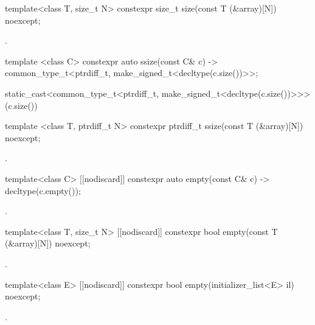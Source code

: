 %
\begin{itemdecl}
template<class T, size_t N> constexpr size_t size(const T (&array)[N]) noexcept;
\end{itemdecl}
\begin{itemdescr}
\pnum \returns {}.
\end{itemdescr}

%
\begin{itemdecl}
template <class C>
constexpr auto ssize(const C& c)
    -> common_type_t<ptrdiff_t, make_signed_t<decltype(c.size())>>;
\end{itemdecl}
\begin{itemdescr}
\pnum \returns
\begin{codeblock}
static_cast<common_type_t<ptrdiff_t, make_signed_t<decltype(c.size())>>>(c.size())
\end{codeblock}
\end{itemdescr}

%
\begin{itemdecl}
template <class T, ptrdiff_t N>
constexpr ptrdiff_t ssize(const T (&array)[N]) noexcept;
\end{itemdecl}
\begin{itemdescr}
\pnum \returns {}.
\end{itemdescr}

%
\begin{itemdecl}
template<class C> [[nodiscard]] constexpr auto empty(const C& c) -> decltype(c.empty());
\end{itemdecl}
\begin{itemdescr}
\pnum \returns {}.
\end{itemdescr}

%
\begin{itemdecl}
template<class T, size_t N> [[nodiscard]] constexpr bool empty(const T (&array)[N]) noexcept;
\end{itemdecl}
\begin{itemdescr}
\pnum \returns {}.
\end{itemdescr}

%
\begin{itemdecl}
template<class E> [[nodiscard]] constexpr bool empty(initializer_list<E> il) noexcept;
\end{itemdecl}
\begin{itemdescr}
\pnum \returns {}.
\end{itemdescr}

